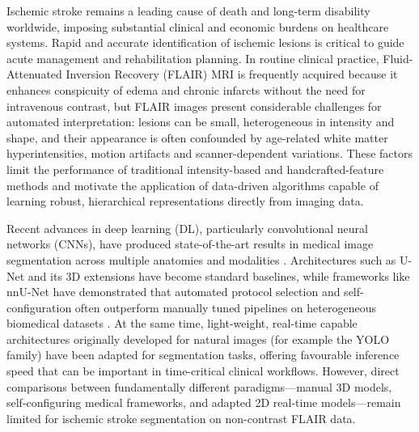 \documentclass[12pt]{article}
\begin{document}
% 

Ischemic stroke remains a leading cause of death and long-term disability worldwide, imposing substantial clinical and economic burdens on healthcare systems. Rapid and accurate identification of ischemic lesions is critical to guide acute management and rehabilitation planning. In routine clinical practice, Fluid-Attenuated Inversion Recovery (FLAIR) MRI is frequently acquired because it enhances conspicuity of edema and chronic infarcts without the need for intravenous contrast, but FLAIR images present considerable challenges for automated interpretation: lesions can be small, heterogeneous in intensity and shape, and their appearance is often confounded by age-related white matter hyperintensities, motion artifacts and scanner-dependent variations. These factors limit the performance of traditional intensity-based and handcrafted-feature methods and motivate the application of data-driven algorithms capable of learning robust, hierarchical representations directly from imaging data.

Recent advances in deep learning (DL), particularly convolutional neural networks (CNNs), have produced state-of-the-art results in medical image segmentation across multiple anatomies and modalities \cite{Liu2021,ronnebergerUNetConvolutionalNetworks2015}. Architectures such as U-Net and its 3D extensions have become standard baselines, while frameworks like nnU-Net have demonstrated that automated protocol selection and self-configuration often outperform manually tuned pipelines on heterogeneous biomedical datasets \cite{Isensee2021}. At the same time, light-weight, real-time capable architectures originally developed for natural images (for example the YOLO family) have been adapted for segmentation tasks, offering favourable inference speed that can be important in time-critical clinical workflows. However, direct comparisons between fundamentally different paradigms—manual 3D models, self-configuring medical frameworks, and adapted 2D real-time models—remain limited for ischemic stroke segmentation on non-contrast FLAIR data.
\end{document}
